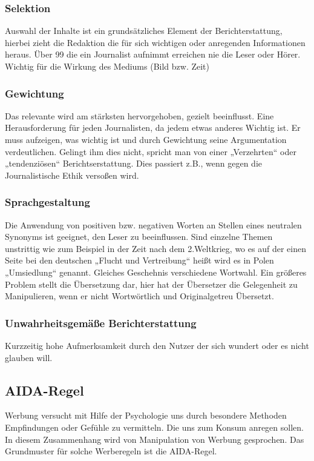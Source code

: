 \subsubsection{Selektion}
Auswahl der Inhalte ist ein grundsätzliches Element der Berichterstattung, hierbei zieht die
Redaktion die für sich wichtigen oder anregenden Informationen  heraus. Über 99%
die ein Journalist aufnimmt erreichen nie die Leser oder Hörer.
Wichtig für die Wirkung des Mediums (Bild bzw. Zeit)

\subsubsection{Gewichtung}
Das relevante wird am stärksten hervorgehoben, gezielt beeinflusst. Eine Herausforderung für jeden
Journalisten, da jedem etwas anderes Wichtig ist. Er muss aufzeigen, was wichtig ist und durch
Gewichtung seine Argumentation verdeutlichen.
Gelingt ihm dies nicht, spricht man von einer „Verzehrten“ oder „tendenziösen“ Berichtserstattung.
Dies passiert z.B., wenn gegen die Journalistische Ethik versoßen wird.

\subsubsection{Sprachgestaltung}
Die Anwendung von positiven bzw. negativen Worten an Stellen eines neutralen Synonyms ist geeignet,
den Leser zu beeinflussen. Sind einzelne Themen unstrittig wie zum Beispiel in der Zeit nach dem
2.Weltkrieg, wo es auf der einen Seite bei den deutschen „Flucht und Vertreibung“ heißt wird es in
Polen „Umsiedlung“ genannt. Gleiches Geschehnis verschiedene Wortwahl. Ein größeres Problem stellt
die Übersetzung dar, hier hat der Übersetzer die Gelegenheit zu Manipulieren, wenn er nicht
Wortwörtlich und Originalgetreu Übersetzt.

\subsubsection{Unwahrheitsgemäße Berichterstattung}
Kurzzeitig hohe Aufmerksamkeit durch den Nutzer der sich wundert oder es nicht glauben will.

\subsection{AIDA-Regel}
Werbung versucht mit Hilfe der Psychologie uns durch besondere Methoden Empfindungen oder Gefühle zu
vermitteln. Die uns zum Konsum anregen sollen. In diesem Zusammenhang wird von Manipulation von
Werbung gesprochen.
Das Grundmuster für solche Werberegeln ist die AIDA-Regel.

